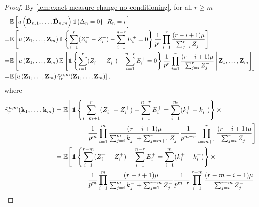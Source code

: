 \begin{proof}
    By \cref{lem:exact-measure-change-no-conditioning}, for all $r \geq m$
    \begin{align*}
        &\E \left[ 
            u\left( 
                \hat{\vD}_{n, 1}, \ldots, \hat{\vD}_{n, m}
             \right)
            \one\{\Delta_n = 0\}
            \, \middle\vert \,
            R_n = r
         \right] \\
        =&\E \left[ 
            u\left( \vZ_1, \ldots, \vZ_m \right)
            \one \left\{ 
                \sum_{i=1}^r (Z_i^- - Z_i^+) - \sum_{i=1}^{n-r} E_i^+ = 0
             \right\}
             \frac{1}{p^r} \prod_{i=1}^r \frac{(r - i + 1) \mu}{\sum_{j=i}^r Z_j^-}
         \right] \\
        =&\E \left[ 
            u\left( \vZ_1, \ldots, \vZ_m \right)
            \E \left[ 
                \one \left\{ 
                    \sum_{i=1}^r (Z_i^- - Z_i^+) - \sum_{i=1}^{n-r} E_i^+ = 0
                \right\}
                \frac{1}{p^r} \prod_{i=1}^r \frac{(r - i + 1) \mu}{\sum_{j=i}^r Z_j^-}
                \, \middle \lvert \,
                \vZ_1, \ldots, \vZ_m
             \right]
         \right] \\
        =&\E \left[ 
            u\left( \vZ_1, \ldots, \vZ_m \right)
            \tilde{\gamma}^{n, m}_r (\vZ_1, \ldots, \vZ_m)
         \right],
    \end{align*}
    where
    \begin{align*}
        \tilde{\gamma}^{n, m}_r (\vk_1, \ldots, \vk_m)
        &= \E \Bigg[ 
            \one \left\{ 
                \sum_{i=m+1}^r (Z_i^- - Z_i^+) - \sum_{i=1}^{n-r} E_i^+ = \sum_{i=1}^m (k_i^+ - k_i^-)
            \right\} \times \\
            &\hspace{5em}
            \frac{1}{p^m} \prod_{i=1}^m \frac{(r - i + 1) \mu}{\sum_{j=i}^m k_j^- + \sum_{j=m+1}^r Z_j^-}
            \frac{1}{p^{m-r}} \prod_{i=m+1}^r \frac{(r - i + 1) \mu}{\sum_{j=i}^r Z_j^-}
        \Bigg] \\
        &= \E \Bigg[ 
            \one \left\{ 
                \sum_{i=1}^{r-m} (Z_i^- - Z_i^+) - \sum_{i=1}^{n-r} E_i^+ = \sum_{i=1}^m (k_i^+ - k_i^-)
            \right\} \times \\
            &\hspace{5em}
            \frac{1}{p^m} \prod_{i=1}^m \frac{(r - i + 1) \mu}{\sum_{j=i}^m k_j^- + \sum_{j=1}^{r-m} Z_j^-}
            \frac{1}{p^{m-r}} \prod_{i=1}^{r-m} \frac{(r - m - i + 1) \mu}{\sum_{j=i}^{r-m} Z_j^-}

\end{align*}
\end{proof}
